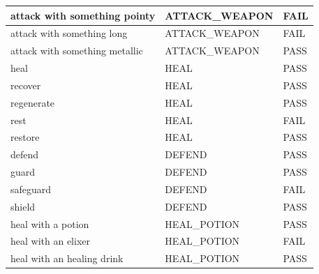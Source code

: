 \documentclass[11pt]{article}
\begin{document}
\begin{appendices}
\begin{table}[H]
\begin{tabular}{lll}
\multicolumn{1}{l|}{attack with something pointy}   & \multicolumn{1}{l|}{ATTACK\_WEAPON}     & \cellcolor[HTML]{FD6864}FAIL \\ \hline
\multicolumn{1}{l|}{attack with something long}     & \multicolumn{1}{l|}{ATTACK\_WEAPON}     & \cellcolor[HTML]{FD6864}FAIL \\ \hline
\multicolumn{1}{l|}{attack with something metallic} & \multicolumn{1}{l|}{ATTACK\_WEAPON}     & \cellcolor[HTML]{67FD9A}PASS \\ \hline
\multicolumn{1}{l|}{heal}                           & \multicolumn{1}{l|}{HEAL}               & \cellcolor[HTML]{67FD9A}PASS \\ \hline
\multicolumn{1}{l|}{recover}                        & \multicolumn{1}{l|}{HEAL}               & \cellcolor[HTML]{67FD9A}PASS \\ \hline
\multicolumn{1}{l|}{regenerate}                     & \multicolumn{1}{l|}{HEAL}               & \cellcolor[HTML]{67FD9A}PASS \\ \hline
\multicolumn{1}{l|}{rest}                           & \multicolumn{1}{l|}{HEAL}               & \cellcolor[HTML]{FD6864}FAIL \\ \hline
\multicolumn{1}{l|}{restore}                           & \multicolumn{1}{l|}{HEAL}               & \cellcolor[HTML]{67FD9A}PASS \\ \hline
\multicolumn{1}{l|}{defend}                           & \multicolumn{1}{l|}{DEFEND}               & \cellcolor[HTML]{67FD9A}PASS \\ \hline
\multicolumn{1}{l|}{guard}                           & \multicolumn{1}{l|}{DEFEND}               & \cellcolor[HTML]{67FD9A}PASS \\ \hline
\multicolumn{1}{l|}{safeguard}                           & \multicolumn{1}{l|}{DEFEND}               & \cellcolor[HTML]{FD6864}FAIL \\ \hline
\multicolumn{1}{l|}{shield}                           & \multicolumn{1}{l|}{DEFEND}               & \cellcolor[HTML]{67FD9A}PASS \\ \hline
\multicolumn{1}{l|}{heal with a potion}             & \multicolumn{1}{l|}{HEAL\_POTION}       & \cellcolor[HTML]{67FD9A}PASS \\ \hline
\multicolumn{1}{l|}{heal with an elixer}            & \multicolumn{1}{l|}{HEAL\_POTION}       & \cellcolor[HTML]{FD6864}FAIL \\ \hline
\multicolumn{1}{l|}{heal with an healing drink}     & \multicolumn{1}{l|}{HEAL\_POTION}       & \cellcolor[HTML]{67FD9A}PASS \\ \hline

\end{tabular}
\end{table}
\end{appendices}
\end{document}
